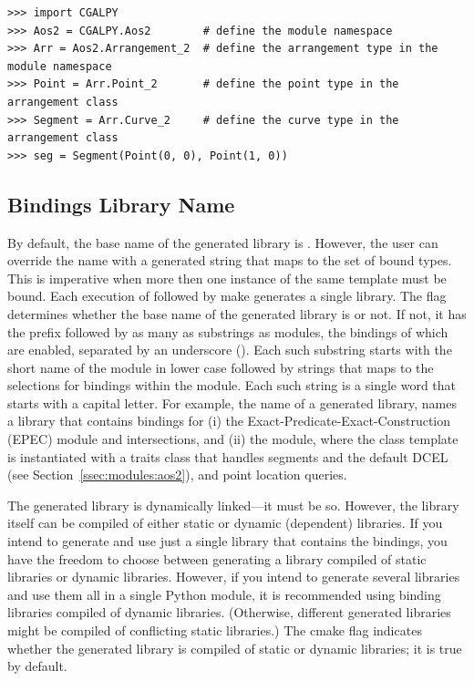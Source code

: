 \begin{lstlisting}[style=pythonStyle]
>>> import CGALPY
>>> Aos2 = CGALPY.Aos2        # define the module namespace
>>> Arr = Aos2.Arrangement_2  # define the arrangement type in the module namespace
>>> Point = Arr.Point_2       # define the point type in the arrangement class
>>> Segment = Arr.Curve_2     # define the curve type in the arrangement class
>>> seg = Segment(Point(0, 0), Point(1, 0))
\end{lstlisting}
\subsection{Bindings Library Name}
\label{sec:gen:libraryName}
By default, the base name of the generated library is
. However, the user can override the name with a
generated string that maps to the set of bound types. This is
imperative when more then one instance of the same template must be
bound. Each execution of  followed by make
generates a single library.  The \cmake{} flag
 determines whether the base
name of the generated library is  or not. If not,
it has the prefix  followed by as many as
substrings as modules, the bindings of which are enabled, separated by
an underscore (\myLstinline{_}). Each such substring starts with the
short name of the module in lower case followed by strings that maps
to the selections for bindings within the module. Each such string is
a single word that starts with a capital letter. For example, the name
 of a generated
library, names a library that contains bindings for (i) the
Exact-Predicate-Exact-Construction (EPEC)
\iiDandiiiDGeometryKernelPackage{} module and intersections, and (ii)
the \iiDArrangementsPackage{} module, where the
 class template is instantiated with a
traits class that handles segments and the default DCEL (see
Section~\ref{ssec:modules:aos2}), and point location queries.

The generated library is dynamically linked---it must be so. However,
the library itself can be compiled of either static or dynamic
(dependent) libraries. If you intend to generate and use just a single
library that contains the bindings, you have the freedom to choose
between generating a library compiled of static libraries or dynamic
libraries. However, if you intend to generate several libraries and
use them all in a single Python module, it is recommended using
binding libraries compiled of dynamic libraries. (Otherwise, different
generated libraries might be compiled of conflicting static
libraries.) The cmake flag 
indicates whether the generated library is compiled of static or
dynamic libraries; it is true by default.

